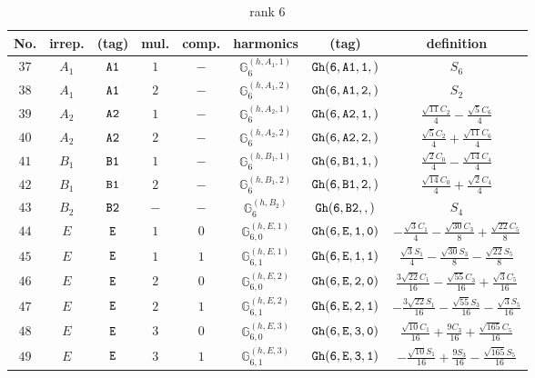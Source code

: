 \documentclass[fleqn,8pt]{jsarticle}
\begin{document}
\begin{table}[ht!]
\begin{center}
\caption{rank 6}
\renewcommand{\arraystretch}{1.3}
\begin{tabular}{cccccccc} \hline \hline
No. & irrep. & (tag) & mul. & comp. & harmonics & (tag) & definition \\ \hline
$ 37 $ & $ A_{1} $ & $ {\tt A1} $ & $ 1 $ & $ - $ & $ \mathbb{G}_{6}^{(h,A_{1},1)} $ & $ {\tt Gh(6,A1,1,)} $ & $ S_{6} $ \\
$ 38 $ & $ A_{1} $ & $ {\tt A1} $ & $ 2 $ & $ - $ & $ \mathbb{G}_{6}^{(h,A_{1},2)} $ & $ {\tt Gh(6,A1,2,)} $ & $ S_{2} $ \\
$ 39 $ & $ A_{2} $ & $ {\tt A2} $ & $ 1 $ & $ - $ & $ \mathbb{G}_{6}^{(h,A_{2},1)} $ & $ {\tt Gh(6,A2,1,)} $ & $ \frac{\sqrt{11} C_{2}}{4} - \frac{\sqrt{5} C_{6}}{4} $ \\
$ 40 $ & $ A_{2} $ & $ {\tt A2} $ & $ 2 $ & $ - $ & $ \mathbb{G}_{6}^{(h,A_{2},2)} $ & $ {\tt Gh(6,A2,2,)} $ & $ \frac{\sqrt{5} C_{2}}{4} + \frac{\sqrt{11} C_{6}}{4} $ \\
$ 41 $ & $ B_{1} $ & $ {\tt B1} $ & $ 1 $ & $ - $ & $ \mathbb{G}_{6}^{(h,B_{1},1)} $ & $ {\tt Gh(6,B1,1,)} $ & $ \frac{\sqrt{2} C_{0}}{4} - \frac{\sqrt{14} C_{4}}{4} $ \\
$ 42 $ & $ B_{1} $ & $ {\tt B1} $ & $ 2 $ & $ - $ & $ \mathbb{G}_{6}^{(h,B_{1},2)} $ & $ {\tt Gh(6,B1,2,)} $ & $ \frac{\sqrt{14} C_{0}}{4} + \frac{\sqrt{2} C_{4}}{4} $ \\
$ 43 $ & $ B_{2} $ & $ {\tt B2} $ & $ - $ & $ - $ & $ \mathbb{G}_{6}^{(h,B_{2})} $ & $ {\tt Gh(6,B2,,)} $ & $ S_{4} $ \\
$ 44 $ & $ E $ & $ {\tt E} $ & $ 1 $ & $ 0 $ & $ \mathbb{G}_{6,0}^{(h,E,1)} $ & $ {\tt Gh(6,E,1,0)} $ & $ - \frac{\sqrt{3} C_{1}}{4} - \frac{\sqrt{30} C_{3}}{8} + \frac{\sqrt{22} C_{5}}{8} $ \\
$ 45 $ & $ E $ & $ {\tt E} $ & $ 1 $ & $ 1 $ & $ \mathbb{G}_{6,1}^{(h,E,1)} $ & $ {\tt Gh(6,E,1,1)} $ & $ \frac{\sqrt{3} S_{1}}{4} - \frac{\sqrt{30} S_{3}}{8} - \frac{\sqrt{22} S_{5}}{8} $ \\
$ 46 $ & $ E $ & $ {\tt E} $ & $ 2 $ & $ 0 $ & $ \mathbb{G}_{6,0}^{(h,E,2)} $ & $ {\tt Gh(6,E,2,0)} $ & $ \frac{3 \sqrt{22} C_{1}}{16} - \frac{\sqrt{55} C_{3}}{16} + \frac{\sqrt{3} C_{5}}{16} $ \\
$ 47 $ & $ E $ & $ {\tt E} $ & $ 2 $ & $ 1 $ & $ \mathbb{G}_{6,1}^{(h,E,2)} $ & $ {\tt Gh(6,E,2,1)} $ & $ - \frac{3 \sqrt{22} S_{1}}{16} - \frac{\sqrt{55} S_{3}}{16} - \frac{\sqrt{3} S_{5}}{16} $ \\
$ 48 $ & $ E $ & $ {\tt E} $ & $ 3 $ & $ 0 $ & $ \mathbb{G}_{6,0}^{(h,E,3)} $ & $ {\tt Gh(6,E,3,0)} $ & $ \frac{\sqrt{10} C_{1}}{16} + \frac{9 C_{3}}{16} + \frac{\sqrt{165} C_{5}}{16} $ \\
$ 49 $ & $ E $ & $ {\tt E} $ & $ 3 $ & $ 1 $ & $ \mathbb{G}_{6,1}^{(h,E,3)} $ & $ {\tt Gh(6,E,3,1)} $ & $ - \frac{\sqrt{10} S_{1}}{16} + \frac{9 S_{3}}{16} - \frac{\sqrt{165} S_{5}}{16} $ \\
 \hline \hline
\end{tabular}
\end{center}
\end{table}
\end{document}
